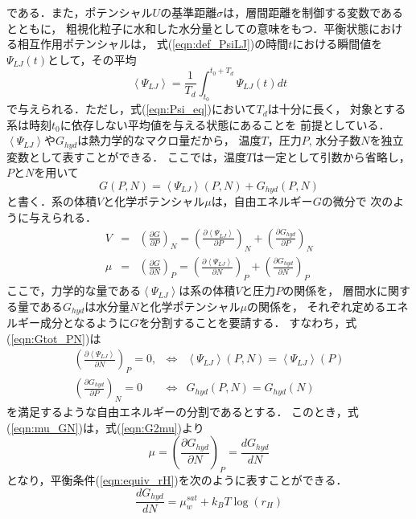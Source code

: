 である．また，ポテンシャル$U$の基準距離$\sigma$は，層間距離を制御する変数であるとともに，
粗視化粒子に水和した水分量としての意味をもつ．平衡状態における相互作用ポテンシャルは，
式(\ref{eqn:def_PsiLJ})の時間$t$における瞬間値を$\Psi_{LJ}(t)$として，その平均
\begin{equation}
	\left< \Psi_{LJ}\right>
	=
	\frac{1}{T_d}\int_{t_0}^{t_0+T_d} \Psi_{LJ}(t)dt
	\label{eqn:Psi_eq}
\end{equation}
で与えられる．ただし，式(\ref{eqn:Psi_eq})において$T_d$は十分に長く，
対象とする系は時刻$t_0$に依存しない平均値を与える状態にあることを
前提としている．\\
\hspace{\parindent}
$\left< \Psi_{LJ} \right>$や$G_{hyd}$は熱力学的なマクロ量だから，
温度$T$，圧力$P$, 水分子数$N$を独立変数として表すことができる．
ここでは，温度$T$は一定として引数から省略し，$P$と$N$を用いて
\begin{equation}
	G(P,N)=\left< \Psi_{LJ} \right>(P,N) +G_{hyd}(P,N)
	\label{eqn:Gtot_PN}
\end{equation}
と書く．系の体積$V$と化学ポテンシャル$\mu$は，自由エネルギー$G$の微分で
次のように与えられる．
\begin{eqnarray}
	V &= & 
	\left( \frac{\partial G}{\partial P} \right)_N 
	=
	\left( \frac{\partial \left< \Psi_{LJ}\right>}{\partial P} \right)_N 
	+
	\left( \frac{\partial G_{hyd}}{\partial P} \right)_N 
	\label{eqn:G2V}
	\\
	\mu &= & \left( \frac{\partial G}{\partial N} \right)_P 
	=
	\left( \frac{\partial \left< \Psi_{LJ}\right>}{\partial N} \right)_P 
	+
	\left( \frac{\partial G_{hyd}}{\partial N} \right)_P 
	\label{eqn:G2mu}
\end{eqnarray}
ここで，力学的な量である$\left<\Psi_{LJ}\right>$は系の体積$V$と圧力$P$の関係を，
層間水に関する量である$G_{hyd}$は水分量$N$と化学ポテンシャル$\mu$の関係を，
それぞれ定めるエネルギー成分となるように$G$を分割することを要請する．
すなわち，式(\ref{eqn:Gtot_PN})は
\begin{eqnarray}
	\left( \frac{\partial \left< \Psi_{LJ}\right>}{\partial N} \right)_P=0, 
	& \Leftrightarrow & 
	\left< \Psi_{LJ}\right>(P,N) = \left< \Psi_{LJ}\right>(P) 
	\label{eqn:assuption1}
	\\ 
	\left( \frac{\partial G_{hyd}}{\partial P} \right)_N =0
	& \Leftrightarrow & 
	 G_{hyd}(P,N) = G_{hyd}(N) 
	\label{eqn:G2mu}
	\label{eqn:asumption2}
\end{eqnarray}
を満足するような自由エネルギーの分割であるとする．
このとき，式(\ref{eqn:mu_GN})は，式(\ref{eqn:G2mu})より
\begin{equation}
	\mu= \left( \frac{\partial G_{hyd}}{\partial N} \right)_P 
	=
	\frac{dG_{hyd}}{dN}
	\label{eqn:G2mu_2}
\end{equation}
となり，平衡条件(\ref{eqn:equiv_rH})を次のように表すことができる．
\begin{equation}
	\frac{d G_{hyd}}{d N}
	=
	\mu_w^{sat} +k_BT \log \left( r_H \right)
	\label{eqn:mu_hyd}
\end{equation}
